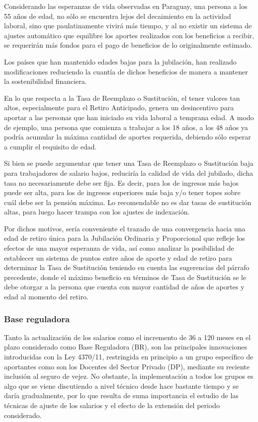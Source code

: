 \documentclass[a4paper,11pt]{article}
\begin{document}
Considerando las esperanzas de vida observadas en Paraguay, una persona a los 55 años de edad, no sólo se encuentra lejos del decaimiento en la actividad laboral, sino que paulatinamente vivirá más tiempo, y al no existir un sistema de ajustes automático que equilibre los aportes realizados con los beneficios a recibir, se requerirán más fondos para el pago de beneficios de lo originalmente estimado.

Los países que han mantenido edades bajas para la jubilación, han realizado modificaciones reduciendo la cuantía de dichos beneficios de manera a mantener la sostenibilidad financiera. 

En lo que respecta a la Tasa de Reemplazo o Sustitución, el tener valores tan altos, especialmente para el Retiro Anticipado, genera un desincentivo para aportar a las personas que han iniciado su vida laboral a temprana edad.  A modo de ejemplo, una persona que comienza a trabajar a los 18 años, a los 48 años ya podría acumular la máxima cantidad de aportes requerida, debiendo sólo esperar a cumplir el requisito de edad.

Si bien se puede argumentar que tener una Tasa de Reemplazo o Sustitución baja para trabajadores de salario bajos, reduciría la calidad de vida del jubilado, dicha tasa no necesariamente debe ser fija. Es decir, para los de ingresos más bajos puede ser alta, para los de ingresos superiores más baja y/o tener topes sobre cuál debe ser la pensión máxima.  Lo recomendable no es dar tasas de sustitución altas, para luego hacer trampa con los ajustes de indexación.

Por dichos motivos, sería conveniente el trazado de una convergencia hacia una edad de retiro única para la Jubilación Ordinaria y Proporcional que refleje los efectos de una mayor esperanza de vida, así como analizar la posibilidad de establecer un sistema de puntos entre años de aporte y edad de retiro para determinar la Tasa de Sustitución teniendo en cuenta las sugerencias del párrafo precedente, donde el máximo beneficio en términos de Tasa de Sustitución se le debe otorgar a la persona que cuenta con mayor cantidad de años de aportes y edad al momento del retiro.

\subsubsection{Base reguladora}

Tanto la actualización de los salarios como el incremento de 36 a 120 meses en el plazo considerado como Base Reguladora (BR), son las principales innovaciones introducidas con la Ley 4370/11, restringida en principio a un grupo específico de aportantes como son los Docentes del Sector Privado (DP), mediante su reciente inclusión al seguro de vejez.  No obstante, la implementación a todos los grupos es algo que se viene discutiendo a nivel técnico desde hace bastante tiempo y se daría gradualmente, por lo que resulta de suma importancia el estudio de las técnicas de ajuste de los salarios y el efecto de la extensión del periodo considerado.
\end{document}
